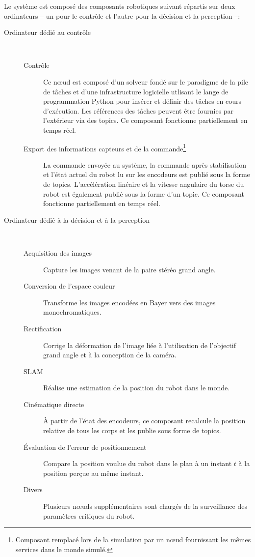 Le système est composé des composants robotiques suivant répartis sur
deux ordinateurs -- un pour le contrôle et l'autre pour la décision et
la perception --:
\begin{description}
\item[Ordinateur dédié au contrôle]
   \\
  \begin{description}
  \item[Contrôle] Ce n\oe ud est composé d'un solveur fondé sur le
    paradigme de la pile de tâches et d'une infrastructure logicielle
    utlisant le lange de programmation Python pour insérer et définir
    des tâches en cours d'exécution. Les références des tâches peuvent
    être fournies par l'extérieur via des topics. Ce composant fonctionne
    partiellement en temps réel.
  \item[Export des informations capteurs et de la
    commande\footnote{Composant remplacé lors de la simulation par un
      n\oe ud fournissant les mêmes services dans le monde
      simulé.}\addtocounter{footnote}{-1}\addtocounter{Hfootnote}{-1}]
    La commande envoyée au système, la commande après stabilisation et
    l'état actuel du robot lu sur les encodeurs est publié sous la
    forme de topics. L'accélération linéaire et la vitesse angulaire
    du torse du robot est également publié sous la forme d'un
    topic. Ce composant fonctionne partiellement en temps réel.
  \end{description}

\item[Ordinateur dédié à la décision et à la perception]
   \\
  \begin{description}
  \item[Acquisition des images\footnotemark] Capture les images venant de la paire
    stéréo grand angle.
  \item[Conversion de l'espace couleur] Transforme les images encodées
    en Bayer vers des images monochromatiques.
  \item[Rectification] Corrige la déformation de l'image liée à
    l'utilisation de l'objectif grand angle et à la conception de la
    caméra.
  \item[SLAM] Réalise une estimation de la position du robot dans le
    monde.
  \item[Cinématique directe] À partir de l'état des encodeurs, ce
    composant recalcule la position relative de tous les corps et les
    publie sous forme de topics.
  \item[Évaluation de l'erreur de positionnement] Compare la position
    voulue du robot dans le plan à un instant $t$ à la position perçue
    au même instant.
  \item[Divers] Plusieurs n\oe uds supplémentaires sont chargés de la
    surveillance des paramètres critiques du robot.
  \end{description}
\end{description}


